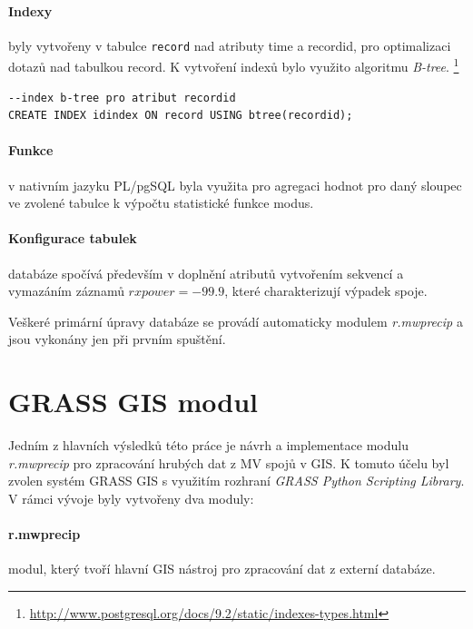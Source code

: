 \documentclass[a4paper,12pt,oneside]{report}
\begin{document}
\paragraph*{Indexy} byly vytvořeny v tabulce \texttt{record} nad
atributy time a recordid, pro optimalizaci dotazů nad tabulkou
record. K vytvoření indexů bylo využito algoritmu
\textit{B-tree}. \footnote{\url{http://www.postgresql.org/docs/9.2/static/indexes-types.html}}

\begin{footnotesize}
\begin{lstlisting}[style=mybash]
--index b-tree pro atribut recordid
CREATE INDEX idindex ON record USING btree(recordid);		
\end{lstlisting}
\end{footnotesize}

\paragraph*{Funkce} v nativním jazyku PL/pgSQL byla využita pro
agregaci hodnot pro daný sloupec ve zvolené tabulce k výpočtu
statistické funkce modus.

\paragraph*{Konfigurace tabulek} databáze spočívá především v doplnění
atributů vytvořením sekvencí a vymazáním záznamů $rxpower= -99.9$,
které charakterizují výpadek spoje.

\bigskip

Veškeré primární úpravy databáze se provádí automaticky modulem
\textit{r.mwprecip} a jsou vykonány jen při prvním spuštění.








\section{GRASS GIS modul}
\label{sec:grassgismodule}
Jedním z hlavních výsledků této práce je návrh a implementace
modulu \textit{r.mwprecip} pro zpracování hrubých dat z MV spojů v
GIS. K tomuto účelu byl zvolen systém GRASS GIS s využitím rozhraní
\textit{GRASS Python Scripting Library}. V rámci vývoje byly vytvořeny
dva moduly:

\paragraph*{r.mwprecip} modul, který tvoří hlavní GIS nástroj pro
zpracování dat z externí databáze.
\end{document}
